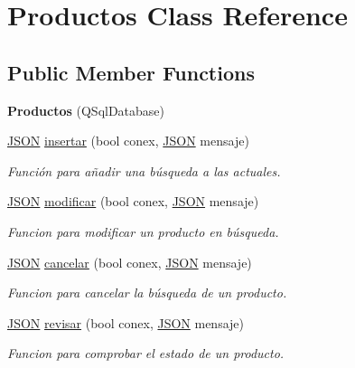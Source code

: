 \hypertarget{classProductos}{}\section{Productos Class Reference}
\label{classProductos}
\subsection*{Public Member Functions}
\begin{DoxyCompactItemize}
\item 
\mbox{\label{classProductos_abd52ab294189b3aa69f9fa70181fd416}} 
{\bfseries Productos} (Q\+Sql\+Database)
\item 
\mbox{\hyperlink{classnlohmann_1_1basic__json}{J\+S\+ON}} \mbox{\hyperlink{classProductos_acaabd57ce0ce71a2126ce49b11eb8ae1}{insertar}} (bool conex, \mbox{\hyperlink{classnlohmann_1_1basic__json}{J\+S\+ON}} mensaje)
\begin{DoxyCompactList}\small\item\em Función para añadir una búsqueda a las actuales. \end{DoxyCompactList}\item 
\mbox{\hyperlink{classnlohmann_1_1basic__json}{J\+S\+ON}} \mbox{\hyperlink{classProductos_a2c74f34bcdc389ffe8b5413f21e21db5}{modificar}} (bool conex, \mbox{\hyperlink{classnlohmann_1_1basic__json}{J\+S\+ON}} mensaje)
\begin{DoxyCompactList}\small\item\em Funcion para modificar un producto en búsqueda. \end{DoxyCompactList}\item 
\mbox{\hyperlink{classnlohmann_1_1basic__json}{J\+S\+ON}} \mbox{\hyperlink{classProductos_a96ba61331dee6f46aa751df1e67c91a5}{cancelar}} (bool conex, \mbox{\hyperlink{classnlohmann_1_1basic__json}{J\+S\+ON}} mensaje)
\begin{DoxyCompactList}\small\item\em Funcion para cancelar la búsqueda de un producto. \end{DoxyCompactList}\item 
\mbox{\hyperlink{classnlohmann_1_1basic__json}{J\+S\+ON}} \mbox{\hyperlink{classProductos_aab417da8db29ade463c7c5102e273d16}{revisar}} (bool conex, \mbox{\hyperlink{classnlohmann_1_1basic__json}{J\+S\+ON}} mensaje)
\begin{DoxyCompactList}\small\item\em Funcion para comprobar el estado de un producto. \end{DoxyCompactList}\end{DoxyCompactItemize}
